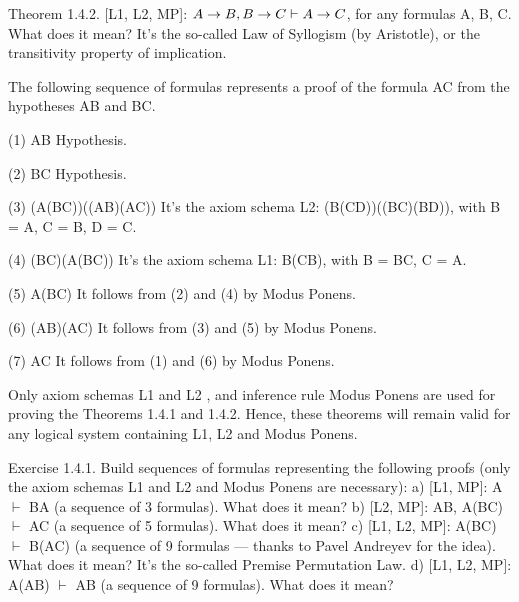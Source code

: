 \begin{theorem}
Theorem 1.4.2. [L1, L2, MP]: \(A\rightarrow B, B\rightarrow C \vdash A\rightarrow C\), for any formulas A, B, C. What does it mean? It's
the so-called Law of Syllogism (by Aristotle), or the transitivity property of implication.
\end{theorem}

The following sequence of formulas represents a proof of the formula A\IMPLIES C from the hypotheses A\IMPLIES B and B\IMPLIES C.

(1) A\IMPLIES B Hypothesis.

(2) B\IMPLIES C Hypothesis.

(3) (A\IMPLIES (B\IMPLIES C))\IMPLIES ((A\IMPLIES B)\IMPLIES (A\IMPLIES C)) It's the axiom schema L2: (B\IMPLIES (C\IMPLIES D))\IMPLIES ((B\IMPLIES C)\IMPLIES (B\IMPLIES D)), with B = A, C = B, D = C.

(4) (B\IMPLIES C)\IMPLIES (A\IMPLIES (B\IMPLIES C)) It's the axiom schema L1: B\IMPLIES (C\IMPLIES B), with B = B\IMPLIES C, C = A.

(5) A\IMPLIES (B\IMPLIES C) It follows from (2) and (4) by Modus Ponens.

(6) (A\IMPLIES B)\IMPLIES (A\IMPLIES C) It follows from (3) and (5) by Modus Ponens.

(7) A\IMPLIES C It follows from (1) and (6) by Modus Ponens.

\begin{note}
Only axiom schemas L1 and L2 , and inference rule Modus Ponens are used for proving the Theorems 1.4.1 and 1.4.2. Hence, these theorems will remain valid for any logical system containing L1, L2 and Modus Ponens.
\end{note}

\begin{exercise}
Exercise 1.4.1. Build sequences of formulas representing the following proofs (only the axiom schemas
L1 and L2 and Modus Ponens are necessary):
a) [L1, MP]: A \(\vdash\) B\IMPLIES A (a sequence of 3 formulas). What does it mean?
b) [L2, MP]: A\IMPLIES B, A\IMPLIES (B\IMPLIES C) \(\vdash\) A\IMPLIES C (a sequence of 5 formulas). What does it mean?
c) [L1, L2, MP]: A\IMPLIES (B\IMPLIES C) \(\vdash\) B\IMPLIES (A\IMPLIES C) (a sequence of 9 formulas --- thanks to Pavel Andreyev for the
idea). What does it mean? It's the so-called Premise Permutation Law.
d) [L1, L2, MP]: A\IMPLIES (A\IMPLIES B) \(\vdash\) A\IMPLIES B (a sequence of 9 formulas). What does it mean?
\end{exercise}

